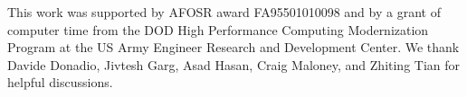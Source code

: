 \documentclass[12pt,twocolumn,iop]{/usr/share/texmf/tex/latex/iop/iopart}[/usr/share/texmf/tex/latex/iop/]
\newcommand{\kv}{\mspace{-4.0mu}\left(\mspace{-8.0mu}
\begin{smallmatrix}&\pmb{\kappa} \\&\nu\end{smallmatrix}
\mspace{-3.0mu}\right)}
\begin{document}
\ack
This work was supported by AFOSR award FA95501010098 and by a grant 
of computer time from the DOD 
High Performance Computing Modernization Program at the US Army Engineer 
Research and Development Center. 
We thank Davide Donadio, Jivtesh Garg, Asad Hasan, Craig Maloney, 
and Zhiting Tian for helpful discussions.

\appendix

% 
% 
% 
\end{document}

